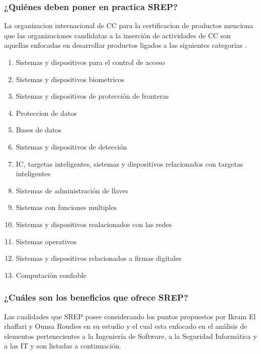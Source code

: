 \documentclass[runningheads,a4paper]{llncs}
\begin{document}
\subsubsection{¿Quiénes deben poner en practica \gls{SREP}?}
La organizacion internacional de \gls{CC} para la certificacion de productos menciona que las organizaciones candidatas a la inserción de actividades de \gls{CC} son aquellas enfocadas en desarrollar productos ligados a las siguientes categorias \cite{CCStat}.

\begin{enumerate}
	\item Sistemas y dispositivos para el control de acceso
	\item Sistemas y dispositivos biometricos
	\item Sistemas  y dispositivos de protección de fronteras
	\item Proteccion de datos
	\item Bases de datos
	\item Sistemas y dispositivos de detección
	\item \gls{IC}, targetas inteligentes, sistemas y dispositivos relacionados con targetas inteligentes
	\item Sistemas de administración de llaves
	\item Sistemas con funciones multiples
	\item Sistemas y dispositivos realacionados con las redes
	\item Sistemas operativos
	\item Sistemas y dispositivos relacionados a firmas digitales
	\item Computación confiable 
\end{enumerate}

\subsubsection{¿Cuáles son los beneficios que ofrece \gls{SREP}?}
Las cualidades que \gls{SREP} posee considerando los puntos propuestos por Ikram El rhaffari y Ounsa Roudies en su estudio y el cual esta enfocado en el análisis de elementos pertenecientes a la Ingeniería de \gls{Software}, a la Seguridad Informática y a las \gls{IT} y son listadas a continuación.  
\end{document}

